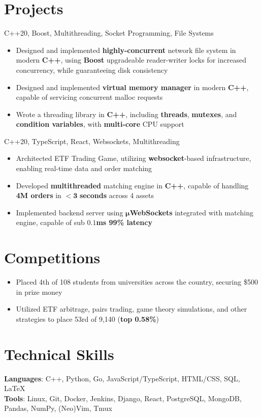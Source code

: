\documentclass[letterpaper,11pt]{article}
\begin{document}
\section{Projects}
{C++20, Boost, Multithreading, Socket Programming, File Systems}{}
\begin{itemize}
  \item Designed and implemented \textbf{highly-concurrent} network file system in modern
        \textbf{C++}, using \textbf{Boost} upgradeable reader-writer locks for
        increased concurrency, while guaranteeing disk consistency
\end{itemize}
\begin{itemize}
  \item Designed and implemented \textbf{virtual memory manager} in modern
        \textbf{C++}, capable of servicing concurrent malloc requests
  \item Wrote a threading library in \textbf{C++}, including \textbf{threads}, \textbf{mutexes},
        and \textbf{condition variables}, with \textbf{multi-core} CPU support
\end{itemize}
{C++20, TypeScript, React, Websockets, Multithreading}{}
\begin{itemize}
  \item Architected ETF Trading Game, utilizing \textbf{websocket}-based
        infrastructure, enabling real-time data and order matching
  \item Developed \textbf{multithreaded} matching engine in \textbf{C++}, capable of
        handling \textbf{4M orders} in $\mathbf{< 3}$ \textbf{seconds} across 4 assets
  \item Implemented backend server using $\mathbf{\mu}$\textbf{WebSockets}
        integrated with matching engine, capable of sub $\mathbf{0.1}$\textbf{ms 99\% latency}
\end{itemize}

\section{Competitions}
\begin{itemize}
  \item Placed 4th of 108 students from universities across the country, securing \$500 in prize money
\end{itemize}
\begin{itemize}
  \item Utilized ETF arbitrage, pairs trading, game theory simulations, and
        other strategies to place 53rd of 9,140 (\textbf{top 0.58\%})
\end{itemize}
\section{Technical Skills}
\textbf{Languages}: C++, Python, Go, JavaScript/TypeScript, HTML/CSS, SQL,
\LaTeX \\
\textbf{Tools}: Linux, Git, Docker, Jenkins, Django, React,
PostgreSQL, MongoDB, Pandas, NumPy, (Neo)Vim, Tmux
\end{document}
